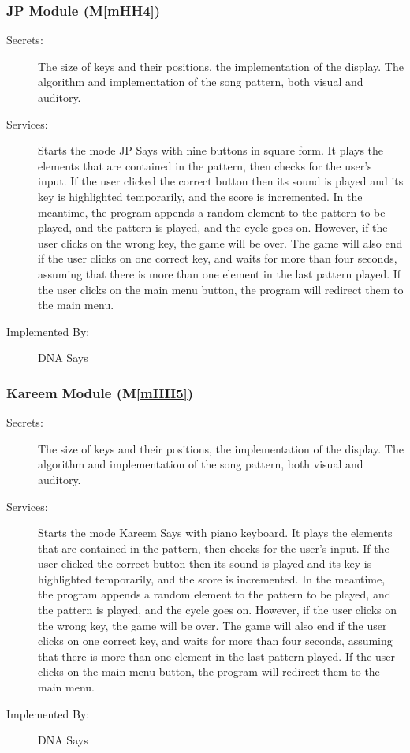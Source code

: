 \documentclass[12pt, titlepage]{article}
\newcommand{\mref}[1]{M\ref{#1}}
\begin{document}
\subsubsection{JP Module (\mref{mHH4})}
\begin{description}
\item[Secrets:]The size of keys and their positions, the implementation of the display. The algorithm and implementation of the song pattern, both visual and auditory.
\item[Services:]Starts the mode JP Says with nine buttons in square form. It plays the elements that are contained in the pattern, then checks for the user's input. If the user clicked the correct button then its sound is played and its key is highlighted temporarily, and the score is incremented. In the meantime, the program appends a random element to the pattern to be played, and the pattern is played, and the cycle goes on. However, if the user clicks on the wrong key, the game will be over. The game will also end if the user clicks on one correct key, and waits for more than four seconds, assuming that there is more than one element in the last pattern played. If the user clicks on the main menu button, the program will redirect them to the main menu.
\item[Implemented By:] DNA Says
\end{description}

\subsubsection{Kareem Module (\mref{mHH5})}
\begin{description}
\item[Secrets:]The size of keys and their positions, the implementation of the display. The algorithm and implementation of the song pattern, both visual and auditory.
\item[Services:]Starts the mode Kareem Says with piano keyboard. It plays the elements that are contained in the pattern, then checks for the user's input. If the user clicked the correct button then its sound is played and its key is highlighted temporarily, and the score is incremented. In the meantime, the program appends a random element to the pattern to be played, and the pattern is played, and the cycle goes on. However, if the user clicks on the wrong key, the game will be over. The game will also end if the user clicks on one correct key, and waits for more than four seconds, assuming that there is more than one element in the last pattern played. If the user clicks on the main menu button, the program will redirect them to the main menu.
\item[Implemented By:] DNA Says
\end{description}
\end{document}
